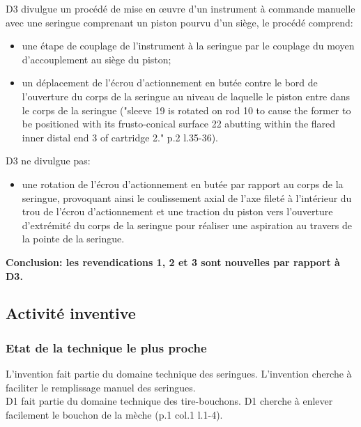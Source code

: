 D3 divulgue un procédé de mise en œuvre d'un instrument à commande manuelle avec une seringue
comprenant un piston pourvu d'un siège, le procédé comprend:
\begin{itemize}
  \item une étape de couplage de l'instrument à la seringue par le couplage du moyen d'accouplement
  au siège du piston;
  \item un déplacement de l'écrou d'actionnement en butée contre le bord de l'ouverture du corps
  de la seringue au niveau de laquelle le piston entre dans le corps de la seringue
  ("sleeve 19 is rotated on rod 10 to cause the former to be positioned with its frusto-conical
  surface 22 abutting within the flared inner distal end 3 of cartridge 2." p.2 l.35-36).\\
\end{itemize}

D3 ne divulgue pas:
\begin{itemize}
  \item une rotation de l'écrou d'actionnement en butée par rapport au corps de la seringue,
  provoquant ainsi le coulissement axial de l'axe fileté à l'intérieur du trou de l'écrou
  d'actionnement et une traction du piston vers l'ouverture d'extrémité du corps de la seringue
  pour réaliser une aspiration au travers de la pointe de la seringue.\\
\end{itemize}

\textbf{Conclusion: les revendications 1, 2 et 3 sont nouvelles par rapport à D3.}\\

\newpage

\subsection{Activité inventive}

\subsubsection{Etat de la technique le plus proche}

L'invention fait partie du domaine technique des seringues. L'invention cherche à faciliter
le remplissage manuel des seringues.\\

D1 fait partie du domaine technique des tire-bouchons. D1 cherche à enlever facilement le bouchon
de la mèche (p.1 col.1 l.1-4).\\

